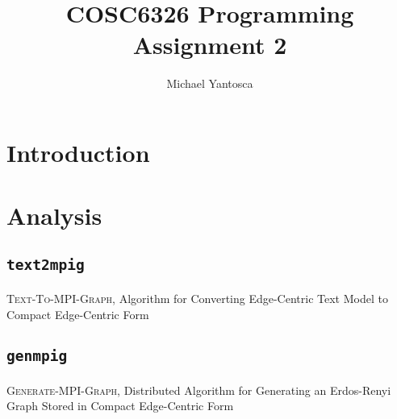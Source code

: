 \documentclass[11pt,epsf]{article}
\date{}
\title{COSC6326 Programming Assignment 2}
\author{Michael Yantosca}
\newcommand{\TODO}[0]{\textbf{\color{red}{TODO}}}
\begin{document}
\maketitle
\tableofcontents

\section{Introduction}{
  \paragraph{}{
    \TODO
  }
}

\section{Analysis}{
  \subsection{\texttt{text2mpig}}{
    \paragraph{}{
      \begin{algorithm}
        \footnotesize
        \caption{\textsc{Text-To-MPI-Graph}, Algorithm for Converting Edge-Centric Text Model to Compact Edge-Centric Form}
        \begin{algorithmic}
          \STATE{\TODO}
        \end{algorithmic}
      \end{algorithm}
    }
    \paragraph{}{
      \TODO
    }
  }

  \subsection{\texttt{genmpig}}{
    \paragraph{}{
      \begin{algorithm}
        \footnotesize
        \caption{\textsc{Generate-MPI-Graph}, Distributed Algorithm for Generating an Erdos-Renyi Graph Stored in Compact Edge-Centric Form}
        \begin{algorithmic}
          \STATE{\TODO}
        \end{algorithmic}
      \end{algorithm}
    }
}}
\end{document}
